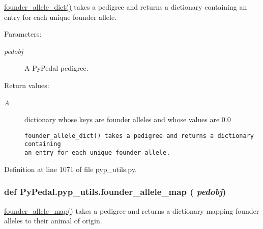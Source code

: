 \hyperlink{namespacePyPedal_1_1pyp__utils_571a7b0f820ad19e66b570ec6a11fd30}{founder\_\-allele\_\-dict()} takes a pedigree and returns a dictionary containing an entry for each unique founder allele. 

\begin{Desc}
\item[Parameters:]
\begin{description}
\item[{\em pedobj}]A Py\-Pedal pedigree. \end{description}
\end{Desc}
\begin{Desc}
\item[Return values:]
\begin{description}
\item[{\em A}]dictionary whose keys are founder alleles and whose values are 0.0

\footnotesize\begin{verbatim}founder_allele_dict() takes a pedigree and returns a dictionary containing
an entry for each unique founder allele.
\end{verbatim}
\normalsize
 \end{description}
\end{Desc}


Definition at line 1071 of file pyp\_\-utils.py.\hypertarget{namespacePyPedal_1_1pyp__utils_1959b9ea868a51acec12651b97868538}{
\subsubsection[founder\_\-allele\_\-map]{\setlength{\rightskip}{0pt plus 5cm}def Py\-Pedal.pyp\_\-utils.founder\_\-allele\_\-map ( {\em pedobj})}}
\label{namespacePyPedal_1_1pyp__utils_1959b9ea868a51acec12651b97868538}


\hyperlink{namespacePyPedal_1_1pyp__utils_1959b9ea868a51acec12651b97868538}{founder\_\-allele\_\-map()} takes a pedigree and returns a dictionary mapping founder alleles to their animal of origin. 

